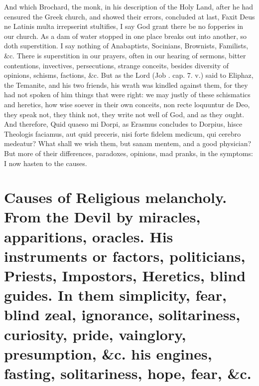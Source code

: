 {And which Brochard, the monk, in his description of the Holy
Land, after he had censured the Greek church, and showed their errors,
concluded at last, Faxit Deus ne Latinis multa irrepserint stultifies,
I say God grant there be no fopperies in our church. As a dam of water
stopped in one place breaks out into another, so doth superstition. I
say nothing of Anabaptists, Socinians, Brownists, Familists, \&c. There
is superstition in our prayers, often in our hearing of sermons, bitter
contentions, invectives, persecutions, strange conceits, besides
diversity of opinions, schisms, factions, \&c. But as the Lord (Job
. cap. 7. v.) said to Eliphaz, the Temanite, and his two friends,
his wrath was kindled against them, for they had not spoken of him
things that were right: we may justly of these schismatics and
heretics, how wise soever in their own conceits, non recte loquuntur de
Deo, they speak not, they think not, they write not well of God, and as
they ought. And therefore, Quid quaeso mi Dorpi, as Erasmus concludes
to Dorpius, hisce Theologis faciamus, aut quid preceris, nisi forte
fidelem medicum, qui cerebro medeatur? What shall we wish them, but
sanam mentem, and a good physician? But more of their differences,
paradoxes, opinions, mad pranks, in the symptoms: I now hasten to the
causes.

\section[Causes of Religious melancholy]{Causes of Religious melancholy. From the Devil by miracles, apparitions, oracles. His instruments or factors, politicians, Priests, Impostors, Heretics, blind guides. In them simplicity, fear, blind zeal, ignorance, solitariness, curiosity, pride, vainglory, presumption, \&c. his engines, fasting, solitariness, hope, fear, \&c.}

}
